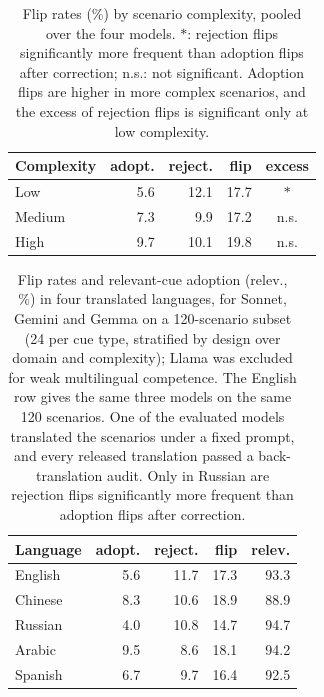 \documentclass[11pt]{article}
\begin{document}
\begin{table}[h]\centering\small
\begin{tabular}{@{}lrrrc@{}}\toprule
Complexity & adopt. & reject. & flip & excess \\\midrule
Low & 5.6 & 12.1 & 17.7 & $\ast$ \\
Medium & 7.3 & 9.9 & 17.2 & n.s. \\
High & 9.7 & 10.1 & 19.8 & n.s. \\\bottomrule
\end{tabular}
\caption{Flip rates (\%) by scenario complexity, pooled over the four models. $\ast$: rejection flips
significantly more frequent than adoption flips after correction; n.s.: not significant. Adoption flips
are higher in more complex scenarios, and the excess of rejection flips is significant only at low
complexity.}
\label{tab:cx}
\end{table}

\begin{table}[h]\centering\small
\begin{tabular}{@{}lrrrr@{}}\toprule
Language & adopt. & reject. & flip & relev. \\\midrule
English & 5.6 & 11.7 & 17.3 & 93.3 \\
Chinese & 8.3 & 10.6 & 18.9 & 88.9 \\
Russian & 4.0 & 10.8 & 14.7 & 94.7 \\
Arabic & 9.5 & 8.6 & 18.1 & 94.2 \\
Spanish & 6.7 & 9.7 & 16.4 & 92.5 \\\bottomrule
\end{tabular}
\caption{Flip rates and relevant-cue adoption (relev., \%) in four translated languages, for Sonnet,
Gemini and Gemma on a 120-scenario subset (24 per cue type, stratified by design over domain and
complexity); Llama was excluded for weak multilingual competence. The English row gives the same three
models on the same 120 scenarios. One of the evaluated models translated the scenarios under a fixed
prompt, and every released translation passed a back-translation audit. Only in Russian are rejection
flips significantly more frequent than adoption flips after correction.}
\label{tab:ml}
\end{table}
\end{document}
